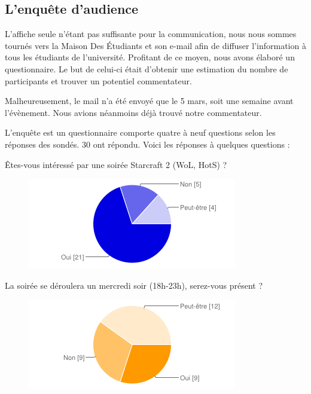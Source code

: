 \subsection{L'enquête d'audience}%
\label{sub:l_enquete_d_audience}

L'affiche seule n'étant pas suffisante pour la communication, nous nous sommes tournés vers la
Maison Des Étudiants et son e-mail afin de diffuser l'information à tous les étudiants de l'université.
Profitant de ce moyen, nous avons élaboré un questionnaire. Le but de celui-ci était d'obtenir une estimation
du nombre de participants et trouver un potentiel commentateur.

Malheureusement, le mail n'a été envoyé que le 5 mars, soit une semaine avant l'évènement.
Nous avions néanmoins déjà trouvé notre commentateur.

L'enquête est un questionnaire comporte quatre à neuf questions selon les réponses des sondés. 30 ont répondu.
Voici les réponses à quelques questions :

Êtes-vous intéressé par une soirée Starcraft 2 (WoL, HotS) ?

\begin{figure}
  \begin{center}
    \includegraphics[scale=1.57]{images/chart_1.png}
    \caption{}
    \label{flow}
  \end{center}
\end{figure}

La soirée se déroulera un mercredi soir (18h-23h), serez-vous présent ?

\begin{figure}
  \begin{center}
    \includegraphics[scale=1.57]{images/chart_2.png}
    \caption{}
    \label{flow}
  \end{center}
\end{figure}

